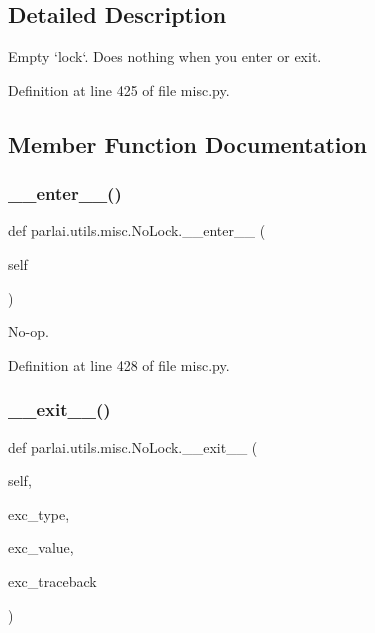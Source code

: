 \subsection{Detailed Description}
\begin{DoxyVerb}Empty `lock`. Does nothing when you enter or exit.\end{DoxyVerb}
 

Definition at line 425 of file misc.\+py.



\subsection{Member Function Documentation}
\mbox{\label{classparlai_1_1utils_1_1misc_1_1NoLock_a8b86612989f12c74a104aedfb85d41ef}} 
\subsubsection{\texorpdfstring{\+\_\+\+\_\+enter\+\_\+\+\_\+()}{\_\_enter\_\_()}}
{\footnotesize\ttfamily def parlai.\+utils.\+misc.\+No\+Lock.\+\_\+\+\_\+enter\+\_\+\+\_\+ (\begin{DoxyParamCaption}\item[{}]{self }\end{DoxyParamCaption})}

\begin{DoxyVerb}No-op.\end{DoxyVerb}
 

Definition at line 428 of file misc.\+py.

\mbox{\label{classparlai_1_1utils_1_1misc_1_1NoLock_a4f7170fad1283a391068f0b403734502}} 
\subsubsection{\texorpdfstring{\+\_\+\+\_\+exit\+\_\+\+\_\+()}{\_\_exit\_\_()}}
{\footnotesize\ttfamily def parlai.\+utils.\+misc.\+No\+Lock.\+\_\+\+\_\+exit\+\_\+\+\_\+ (\begin{DoxyParamCaption}\item[{}]{self,  }\item[{}]{exc\+\_\+type,  }\item[{}]{exc\+\_\+value,  }\item[{}]{exc\+\_\+traceback }\end{DoxyParamCaption})}

